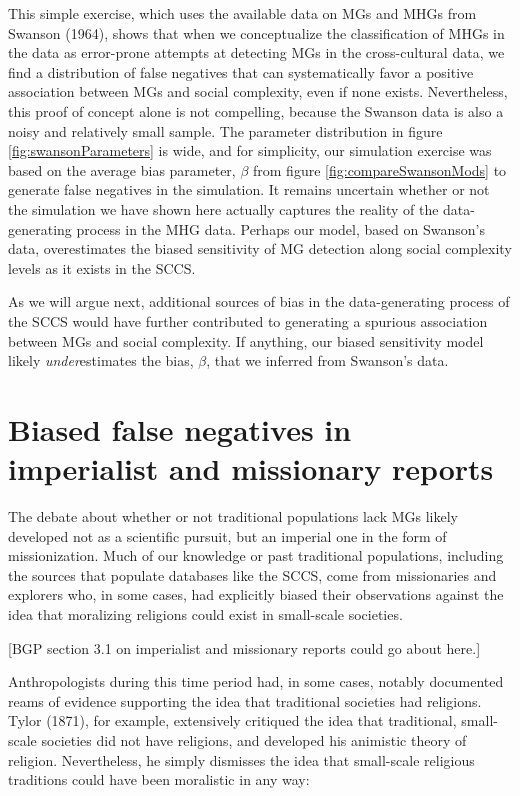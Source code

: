 \documentclass[
]{article}
\begin{document}
This simple exercise, which uses the available data on MGs and MHGs from Swanson (1964), shows that when we conceptualize the classification of MHGs in the data as error-prone attempts at detecting MGs in the cross-cultural data, we find a distribution of false negatives that can systematically favor a positive association between MGs and social complexity, even if none exists. Nevertheless, this proof of concept alone is not compelling, because the Swanson data is also a noisy and relatively small sample. The parameter distribution in figure \ref{fig:swansonParameters} is wide, and for simplicity, our simulation exercise was based on the average bias parameter, \(\beta\) from figure \ref{fig:compareSwansonMods} to generate false negatives in the simulation. It remains uncertain whether or not the simulation we have shown here actually captures the reality of the data-generating process in the MHG data. Perhaps our model, based on Swanson's data, overestimates the biased sensitivity of MG detection along social complexity levels as it exists in the SCCS.

As we will argue next, additional sources of bias in the data-generating process of the SCCS would have further contributed to generating a spurious association between MGs and social complexity. If anything, our biased sensitivity model likely \emph{under}estimates the bias, \(\beta\), that we inferred from Swanson's data.

\section{Biased false negatives in imperialist and missionary reports}\label{missionaries}

The debate about whether or not traditional populations lack MGs likely developed not as a scientific pursuit, but an imperial one in the form of missionization. Much of our knowledge or past traditional populations, including the sources that populate databases like the SCCS, come from missionaries and explorers who, in some cases, had explicitly biased their observations against the idea that moralizing religions could exist in small-scale societies.

{[}BGP section 3.1 on imperialist and missionary reports could go about here.{]}

Anthropologists during this time period had, in some cases, notably documented reams of evidence supporting the idea that traditional societies had religions. Tylor (1871), for example, extensively critiqued the idea that traditional, small-scale societies did not have religions, and developed his animistic theory of religion. Nevertheless, he simply dismisses the idea that small-scale religious traditions could have been moralistic in any way:
\end{document}
